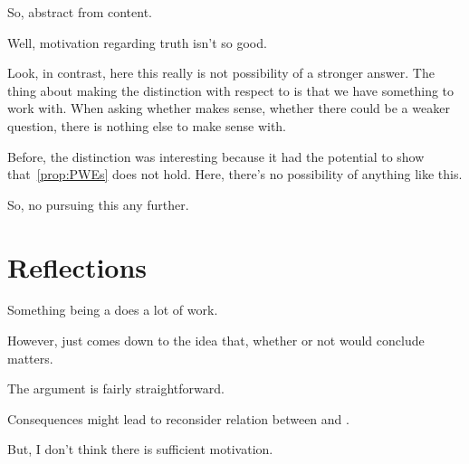 \begin{note}
  So, abstract from content.
\end{note}

\begin{note}
  Well, motivation regarding truth isn't so good.
\end{note}

\begin{note}
  Look, in contrast, here this really is not possibility of a stronger answer.
  The thing about making the distinction with respect to \qzS{} is that we have something to work with.
  When asking whether \qzS{} makes sense, whether there could be a weaker question, there is nothing else to make sense with.

  Before, the distinction was interesting because it had the potential to show that~\autoref{prop:PWEs} does not hold.
  Here, there's no possibility of anything like this.
\end{note}

\begin{note}
  So, no pursuing this any further.
\end{note}

\section{Reflections}
\label{sec:reflections}

\begin{note}
  Something being a \requ{} does a lot of work.

  However, just comes down to the idea that, whether or not would conclude matters.

  The argument is fairly straightforward.

  Consequences might lead to reconsider relation between \qzS{} and \qWhy{}.

  But, I don't think there is sufficient motivation.
\end{note}

